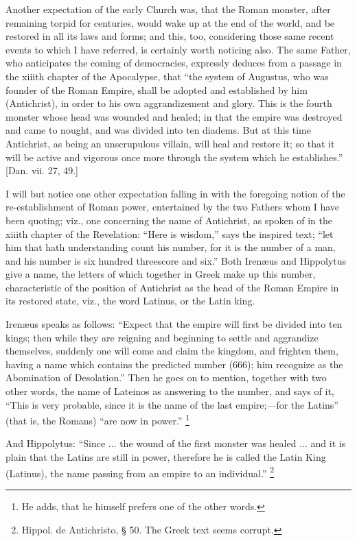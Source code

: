 Another expectation of the early Church was, that the Roman
monster, after remaining torpid for centuries, would wake up at the
end of the world, and be restored in all its laws and forms; and this,
too, considering those same recent events to which I have referred, is
certainly worth noticing also. The same Father, who anticipates the
coming of democracies, expressly deduces from a passage in the xiiith
chapter of the Apocalypse, that ``the system of Augustus, who
was founder of the Roman Empire, shall be adopted and established by
him (Antichrist), in order to his own aggrandizement and glory. This
is the fourth monster whose head was wounded and healed; in that the
empire was destroyed and came to nought, and was divided into ten
diadems. But at this time Antichrist, as being an unscrupulous
villain, will heal and restore it; so that it will be active and
vigorous once more through the system which he establishes.''
[Dan. vii. 27, 49.]

I will but notice one other expectation falling in with the
foregoing notion of the re-establishment of Roman power, entertained
by the two Fathers whom I have been quoting; viz., one concerning the
name of Antichrist, as spoken of in the xiiith chapter of the
Revelation: ``Here is wisdom,'' says the inspired text;
``let him that hath understanding count his number, for it is the
number of a man, and his number is six hundred threescore and
six.'' Both Irenæus and Hippolytus give a name, the letters of
which together in Greek make up this number, characteristic of the
position of Antichrist as the head of the Roman Empire in its restored
state, viz., the word Latinus, or the Latin king.

Irenæus speaks as follows: ``Expect that the empire will first
be divided into ten kings; then while they are reigning and beginning
to settle and aggrandize themselves, suddenly one will come and claim
the kingdom, and frighten them, having a name which contains the
predicted number (666); him recognize as the Abomination of
Desolation.'' Then he goes on to mention, together with two other
words, the name of Lateinos as answering to the number, and says of
it, ``This is very probable, since it is the name of the last
empire;—for the Latins'' (that is, the Romans) ``are now in
power.'' \footnote{He adds, that he himself prefers one of the
other words.}

And Hippolytus: ``Since ... the wound of the first monster was
healed ... and it is plain that the Latins are still in power,
therefore he is called the Latin King (Latinus), the name passing from
an empire to an individual.'' \footnote{Hippol. de Antichristo, § 50. The Greek
text seems corrupt.}


